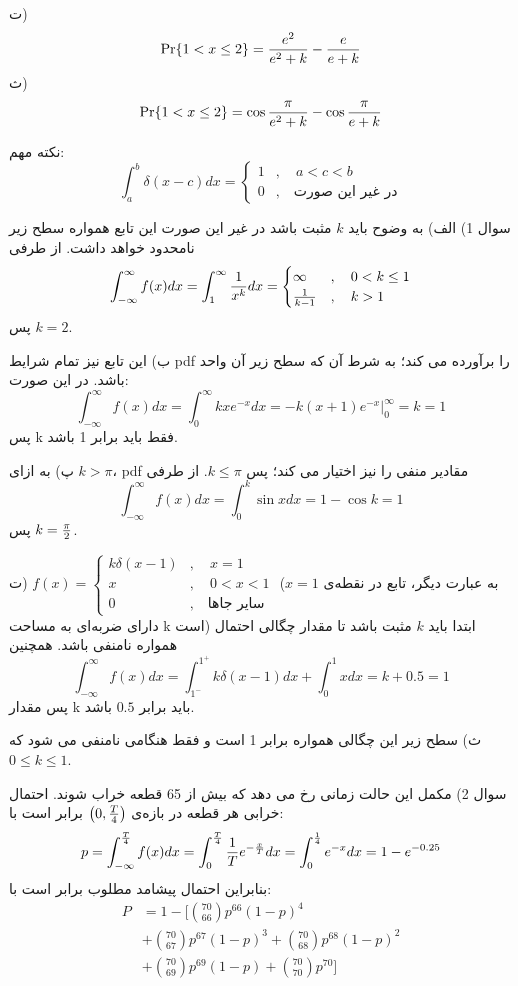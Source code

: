 \documentclass[10pt,letterpaper]{report}
\begin{document}
ت) 
$$
\Pr\{1<x\le 2\}={e^2\over e^2+k}-{e\over e+k}
$$
ث)
$$
\Pr\{1<x\le 2\}=\cos {\pi\over e^2+k}-\cos {\pi\over e+k}
$$

{\color{red}
نکته مهم:
$$
\int_a^b\delta(x-c)dx=\begin{cases}
1&,\quad a<c<b\\
0&,\quad \text{در غیر این صورت}
\end{cases}
$$
}

سوال 1) الف) به وضوح باید $k$ مثبت باشد در غیر این صورت این تابع همواره سطح زیر نامحدود خواهد داشت. از طرفی
$$
\int_{-\infty}^\infty f(x)dx=\int_1^\infty {1\over x^k}dx=\begin{cases}
\infty&,\quad0<k\le1\\
{1\over k-1}&,\quad k>1
\end{cases}
$$
پس $k=2$.

ب) این تابع نیز تمام شرایط pdf را برآورده می کند؛ به شرط آن که سطح زیر آن واحد باشد. در این صورت:
$$
\int_{-\infty}^\infty f(x)dx=\int_0^\infty kxe^{-x}dx=-k(x+1)e^{-x}|_0^\infty=k=1
$$
پس k فقط باید برابر 1 باشد.

پ) به ازای $k>\pi$، pdf مقادیر منفی را نیز اختیار می کند؛ پس $k\le \pi$. از طرفی
$$
\int_{-\infty}^\infty f(x)dx=\int_0^k\sin xdx=1-\cos k=1
$$
پس $k={\pi\over 2}$.

ت)
$
f(x)=\begin{cases}
k\delta(x-1)&,\quad x=1\\
x&,\quad 0<x<1\\
0&,\quad \text{سایر جاها}
\end{cases}
$
(به عبارت دیگر، تابع در نقطه‌ی $x=1$ دارای ضربه‌ای به مساحت k است)
ابتدا باید $k$ مثبت باشد تا مقدار چگالی احتمال همواره نامنفی باشد. همچنین
$$
\int_{-\infty}^\infty f(x)dx=\int_{1^-}^{1^+} k\delta(x-1)dx+\int_0^1 xdx=k+0.5=1
$$
پس مقدار k باید برابر $0.5$ باشد.

ث) سطح زیر این چگالی همواره برابر 1 است و فقط هنگامی نامنفی می شود که 
$
0\le k\le 1
$.

سوال 2) مکمل این حالت زمانی رخ می دهد که بیش از 65 قطعه خراب شوند. احتمال خرابی هر قطعه در بازه‌ی $
\left(0,{T\over 4}\right)
$
برابر است با:
$$
p=\int_{-\infty}^{T\over 4}f(x)dx=
\int_{0}^{T\over 4}{1\over T}e^{-{x\over T}}dx=
\int_{0}^{1\over 4}e^{-x}dx=1-e^{-0.25}
$$
بنابراین احتمال پیشامد مطلوب برابر است با:
\[
\begin{split}
P&=1-[\binom{70}{66}p^{66}(1-p)^4\\&+\binom{70}{67}p^{67}(1-p)^3
+\binom{70}{68}p^{68}(1-p)^2
\\&+\binom{70}{69}p^{69}(1-p)
+\binom{70}{70}p^{70}
]
\end{split}
\]
\end{document}
